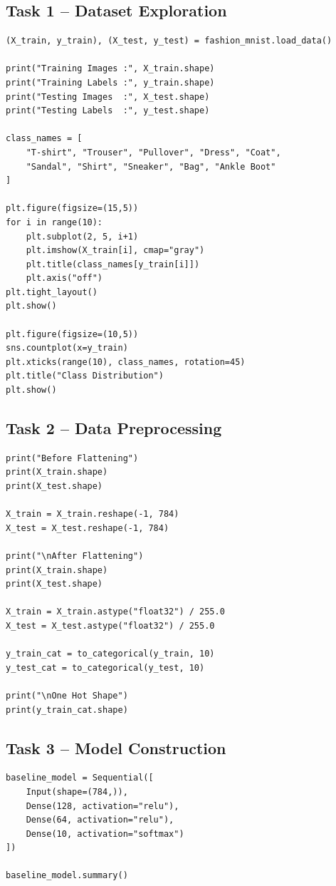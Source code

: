 \documentclass[11pt]{article}
\begin{document}
\subsection{Task 1 -- Dataset Exploration}
\begin{lstlisting}
(X_train, y_train), (X_test, y_test) = fashion_mnist.load_data()

print("Training Images :", X_train.shape)
print("Training Labels :", y_train.shape)
print("Testing Images  :", X_test.shape)
print("Testing Labels  :", y_test.shape)

class_names = [
    "T-shirt", "Trouser", "Pullover", "Dress", "Coat",
    "Sandal", "Shirt", "Sneaker", "Bag", "Ankle Boot"
]

plt.figure(figsize=(15,5))
for i in range(10):
    plt.subplot(2, 5, i+1)
    plt.imshow(X_train[i], cmap="gray")
    plt.title(class_names[y_train[i]])
    plt.axis("off")
plt.tight_layout()
plt.show()

plt.figure(figsize=(10,5))
sns.countplot(x=y_train)
plt.xticks(range(10), class_names, rotation=45)
plt.title("Class Distribution")
plt.show()
\end{lstlisting}

\subsection{Task 2 -- Data Preprocessing}
\begin{lstlisting}
print("Before Flattening")
print(X_train.shape)
print(X_test.shape)

X_train = X_train.reshape(-1, 784)
X_test = X_test.reshape(-1, 784)

print("\nAfter Flattening")
print(X_train.shape)
print(X_test.shape)

X_train = X_train.astype("float32") / 255.0
X_test = X_test.astype("float32") / 255.0

y_train_cat = to_categorical(y_train, 10)
y_test_cat = to_categorical(y_test, 10)

print("\nOne Hot Shape")
print(y_train_cat.shape)
\end{lstlisting}

\subsection{Task 3 -- Model Construction}
\begin{lstlisting}
baseline_model = Sequential([
    Input(shape=(784,)),
    Dense(128, activation="relu"),
    Dense(64, activation="relu"),
    Dense(10, activation="softmax")
])

baseline_model.summary()
\end{lstlisting}
\end{document}

